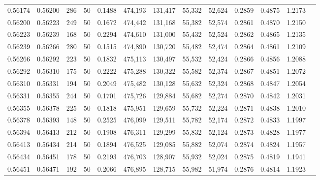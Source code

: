 \begin{tabular}{rrrrrrrrrrrrr}
0.56174 & 0.56200 &   286 &  50 &                                     0.1488 & 474,193 & 131,417 &  55,332 &  52,624 & 0.2859 & 0.4875 & 1.2173 \\
0.56200 & 0.56223 &   249 &  50 &                                     0.1672 & 474,442 & 131,168 &  55,382 &  52,574 & 0.2861 & 0.4870 & 1.2150 \\
0.56223 & 0.56239 &   168 &  50 &                                     0.2294 & 474,610 & 131,000 &  55,432 &  52,524 & 0.2862 & 0.4865 & 1.2135 \\
0.56239 & 0.56266 &   280 &  50 &                                     0.1515 & 474,890 & 130,720 &  55,482 &  52,474 & 0.2864 & 0.4861 & 1.2109 \\
0.56266 & 0.56292 &   223 &  50 &                                     0.1832 & 475,113 & 130,497 &  55,532 &  52,424 & 0.2866 & 0.4856 & 1.2088 \\
0.56292 & 0.56310 &   175 &  50 &                                     0.2222 & 475,288 & 130,322 &  55,582 &  52,374 & 0.2867 & 0.4851 & 1.2072 \\
0.56310 & 0.56331 &   194 &  50 &                                     0.2049 & 475,482 & 130,128 &  55,632 &  52,324 & 0.2868 & 0.4847 & 1.2054 \\
0.56331 & 0.56355 &   244 &  50 &                                     0.1701 & 475,726 & 129,884 &  55,682 &  52,274 & 0.2870 & 0.4842 & 1.2031 \\
0.56355 & 0.56378 &   225 &  50 &                                     0.1818 & 475,951 & 129,659 &  55,732 &  52,224 & 0.2871 & 0.4838 & 1.2010 \\
0.56378 & 0.56393 &   148 &  50 &                                     0.2525 & 476,099 & 129,511 &  55,782 &  52,174 & 0.2872 & 0.4833 & 1.1997 \\
0.56394 & 0.56413 &   212 &  50 &                                     0.1908 & 476,311 & 129,299 &  55,832 &  52,124 & 0.2873 & 0.4828 & 1.1977 \\
0.56413 & 0.56434 &   214 &  50 &                                     0.1894 & 476,525 & 129,085 &  55,882 &  52,074 & 0.2874 & 0.4824 & 1.1957 \\
0.56434 & 0.56451 &   178 &  50 &                                     0.2193 & 476,703 & 128,907 &  55,932 &  52,024 & 0.2875 & 0.4819 & 1.1941 \\
0.56451 & 0.56471 &   192 &  50 &                                     0.2066 & 476,895 & 128,715 &  55,982 &  51,974 & 0.2876 & 0.4814 & 1.1923 \\

\end{tabular}
